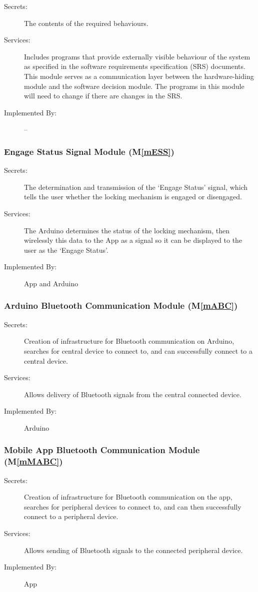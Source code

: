 \documentclass[12pt, titlepage]{article}
\newcommand{\mref}[1]{M\ref{#1}}
\begin{document}
\begin{description}
\item[Secrets:]The contents of the required behaviours.
\item[Services:]Includes programs that provide externally visible behaviour of
  the system as specified in the software requirements specification (SRS)
  documents. This module serves as a communication layer between the
  hardware-hiding module and the software decision module. The programs in this
  module will need to change if there are changes in the SRS.
\item[Implemented By:] --
\end{description}


\subsubsection{Engage Status Signal Module (\mref{mESS})}
\begin{description}
\item[Secrets:]The determination and transmission of the ‘Engage Status’ signal, which tells the user whether the locking mechanism is engaged or disengaged.
\item[Services:]The Arduino determines the status of the locking mechanism, then wirelessly 
 this data to the App as a signal so it can be displayed to the user as the ‘Engage Status’.
\item[Implemented By:]App and Arduino
\end{description}

\subsubsection{Arduino Bluetooth Communication Module (\mref{mABC})}
\begin{description}
\item[Secrets:]Creation of infrastructure for Bluetooth communication on Arduino, searches for central device to connect to, and can successfully connect to a central device.
\item[Services:]Allows delivery of Bluetooth signals from the central connected device. 
\item[Implemented By:] Arduino
\end{description}

\subsubsection{Mobile App Bluetooth Communication Module (\mref{mMABC})}
\begin{description}
\item[Secrets:]Creation of infrastructure for Bluetooth communication on the app, searches for peripheral devices to connect to, and can then successfully connect to a peripheral device.
\item[Services:]Allows sending of Bluetooth signals to the connected peripheral device.
\item[Implemented By:] App
\end{description}
\end{document}
